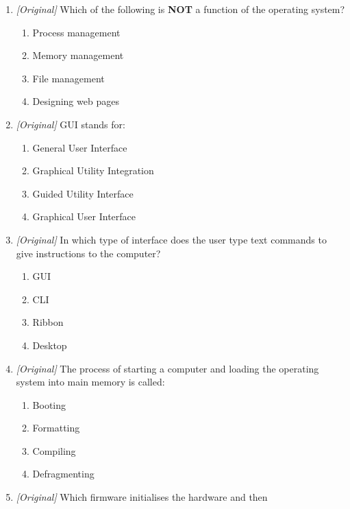 \begin{enumerate}[label=\textbf{Q\arabic*.}, leftmargin=*]
  system that interacts directly with the hardware?
  \begin{enumerate}[label=\Alph*.]
    \item Kernel
    \item GUI
    \item Bootstrap
    \item Compiler
  \end{enumerate}
\item \textit{[Original]} Which of the following is \textbf{NOT} a function of
  the operating system?
  \begin{enumerate}[label=\Alph*.]
    \item Process management
    \item Memory management
    \item File management
    \item Designing web pages
  \end{enumerate}
\item \textit{[Original]} GUI stands for:
  \begin{enumerate}[label=\Alph*.]
    \item General User Interface
    \item Graphical Utility Integration
    \item Guided Utility Interface
    \item Graphical User Interface
  \end{enumerate}
\item \textit{[Original]} In which type of interface does the user type text
  commands to give instructions to the computer?
  \begin{enumerate}[label=\Alph*.]
    \item GUI
    \item CLI
    \item Ribbon
    \item Desktop
  \end{enumerate}
\item \textit{[Original]} The process of starting a computer and loading the
  operating system into main memory is called:
  \begin{enumerate}[label=\Alph*.]
    \item Booting
    \item Formatting
    \item Compiling
    \item Defragmenting
  \end{enumerate}
\item \textit{[Original]} Which firmware initialises the hardware and then

\end{enumerate}
